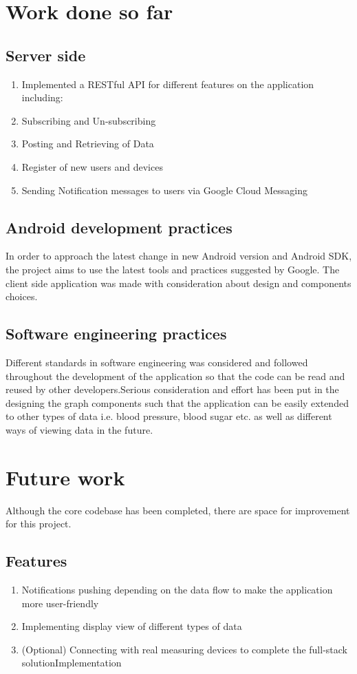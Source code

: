 \section{Work done so far}
\label{sec:Work done so far}
\subsection{Server side}

\begin{enumerate}
    \item Implemented a RESTful API for different features on the application including:
    \item Subscribing and Un-subscribing
    \item Posting and Retrieving of Data
    \item Register of new users and devices
    \item Sending Notification messages to users via Google Cloud Messaging
\end{enumerate}

\subsection{Android development practices}
In order to approach the latest change in new Android version and Android SDK, the project aims to use the latest tools
and practices suggested by Google. The client side application was made with consideration about design and components
choices.

\subsection{Software engineering practices}
Different standards in software engineering was considered and followed throughout the development of the application so
that the code can be read and reused by other developers.Serious consideration and effort has been put in the designing
the graph components such that the application can be easily extended to other types of data i.e. blood pressure, blood
sugar etc. as well as different ways of viewing data in the future.

\section{Future work} \label{sec:Work done so far}
Although the core codebase has been completed, there are space for improvement for this project.
\subsection{Features}
\begin{enumerate}
    \item Notifications pushing depending on the data flow to make the application more
        user-friendly
    \item Implementing display view of different types of data
    \item (Optional) Connecting with real measuring devices
        to complete the full-stack solutionImplementation
\end{enumerate}

